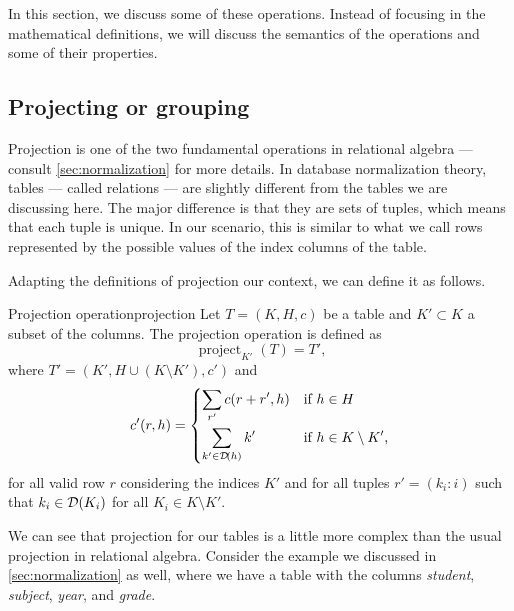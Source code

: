 In this section, we discuss some of these operations.  Instead of focusing in the
mathematical definitions, we will discuss the semantics of the operations and some
of their properties.

\subsection{Projecting or grouping}
\label{sub:projection}

Projection is one of the two fundamental operations in relational algebra --- consult
\cref{sec:normalization} for more details.  In database normalization theory, tables ---
called relations --- are slightly different from the tables we are discussing here. The
major difference is that they are sets of tuples, which means that each tuple is unique.
In our scenario, this is similar to what we call rows represented by the possible values
of the index columns of the table.

Adapting the definitions of projection our context, we can define it as follows.

\begin{defbox}{Projection operation}{projection}
  Let $T = (K, H, c)$ be a table and $K' \subset K$ a subset of the columns.  The
  projection operation is defined as \[
    \operatorname{project}_{K'}(T) = T'\text{,}
  \] where $T' = (K', H \cup (K \setminus K'), c')$ and \[
    c'(r, h) = \begin{dcases}
      \sum_{r'} c(r + r', h) & \text{if } h \in H \\
      \sum_{k' \in \mathcal{D}\!\left(h\right)} k' & \text{if } h \in K \setminus K'\text{,}
    \end{dcases}
  \] for all valid row $r$ considering the indices $K'$ and for all tuples $r' = (k_i :
  i)$ such that $k_i \in \mathcal{D}\!\left(K_i\right)$ for all $K_i \in K \setminus K'$.
\end{defbox}

We can see that projection for our tables is a little more complex than the usual
projection in relational algebra.  Consider the example we discussed in
\cref{sec:normalization} as well, where we have a table with the columns \emph{student},
\emph{subject}, \emph{year}, and \emph{grade}.


